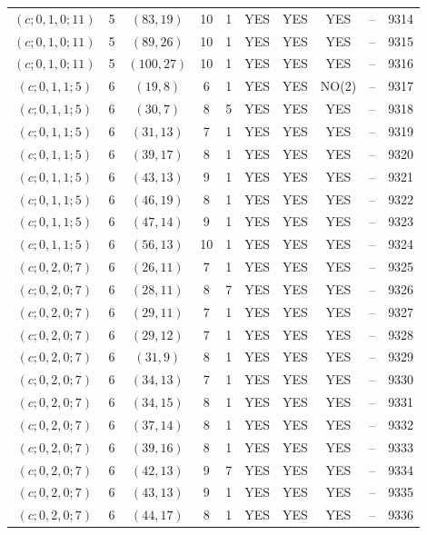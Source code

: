 \begin{longtable}{|c|c|c|c|c|c|c|c|c|c|}
$(c; 0, 1, 0; 11)$ & 5 & $(83, 19)$ & 10 & 1 & YES & YES & YES & -- & 9314\\
$(c; 0, 1, 0; 11)$ & 5 & $(89, 26)$ & 10 & 1 & YES & YES & YES & -- & 9315\\
$(c; 0, 1, 0; 11)$ & 5 & $(100, 27)$ & 10 & 1 & YES & YES & YES & -- & 9316\\
$(c; 0, 1, 1; 5)$ & 6 & $(19, 8)$ & 6 & 1 & YES & YES & NO(2) & -- & 9317\\
$(c; 0, 1, 1; 5)$ & 6 & $(30, 7)$ & 8 & 5 & YES & YES & YES & -- & 9318\\
$(c; 0, 1, 1; 5)$ & 6 & $(31, 13)$ & 7 & 1 & YES & YES & YES & -- & 9319\\
$(c; 0, 1, 1; 5)$ & 6 & $(39, 17)$ & 8 & 1 & YES & YES & YES & -- & 9320\\
$(c; 0, 1, 1; 5)$ & 6 & $(43, 13)$ & 9 & 1 & YES & YES & YES & -- & 9321\\
$(c; 0, 1, 1; 5)$ & 6 & $(46, 19)$ & 8 & 1 & YES & YES & YES & -- & 9322\\
$(c; 0, 1, 1; 5)$ & 6 & $(47, 14)$ & 9 & 1 & YES & YES & YES & -- & 9323\\
$(c; 0, 1, 1; 5)$ & 6 & $(56, 13)$ & 10 & 1 & YES & YES & YES & -- & 9324\\
$(c; 0, 2, 0; 7)$ & 6 & $(26, 11)$ & 7 & 1 & YES & YES & YES & -- & 9325\\
$(c; 0, 2, 0; 7)$ & 6 & $(28, 11)$ & 8 & 7 & YES & YES & YES & -- & 9326\\
$(c; 0, 2, 0; 7)$ & 6 & $(29, 11)$ & 7 & 1 & YES & YES & YES & -- & 9327\\
$(c; 0, 2, 0; 7)$ & 6 & $(29, 12)$ & 7 & 1 & YES & YES & YES & -- & 9328\\
$(c; 0, 2, 0; 7)$ & 6 & $(31, 9)$ & 8 & 1 & YES & YES & YES & -- & 9329\\
$(c; 0, 2, 0; 7)$ & 6 & $(34, 13)$ & 7 & 1 & YES & YES & YES & -- & 9330\\
$(c; 0, 2, 0; 7)$ & 6 & $(34, 15)$ & 8 & 1 & YES & YES & YES & -- & 9331\\
$(c; 0, 2, 0; 7)$ & 6 & $(37, 14)$ & 8 & 1 & YES & YES & YES & -- & 9332\\
$(c; 0, 2, 0; 7)$ & 6 & $(39, 16)$ & 8 & 1 & YES & YES & YES & -- & 9333\\
$(c; 0, 2, 0; 7)$ & 6 & $(42, 13)$ & 9 & 7 & YES & YES & YES & -- & 9334\\
$(c; 0, 2, 0; 7)$ & 6 & $(43, 13)$ & 9 & 1 & YES & YES & YES & -- & 9335\\
$(c; 0, 2, 0; 7)$ & 6 & $(44, 17)$ & 8 & 1 & YES & YES & YES & -- & 9336\\

\end{longtable}
